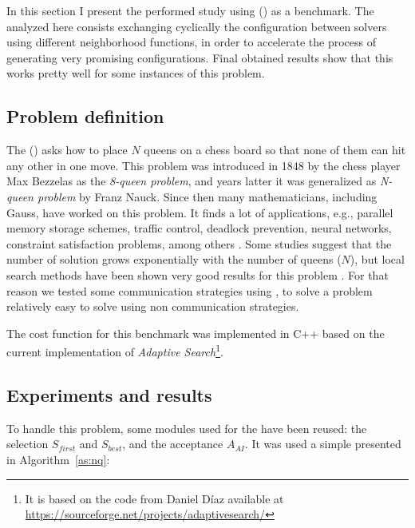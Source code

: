In this section I present the performed study using \nqp{} (\NQP) as a benchmark. The \commstr{} analyzed here consists exchanging cyclically the configuration between solvers using different neighborhood functions, in order to accelerate the process of generating very promising configurations. Final obtained results show that this \commstr{} works pretty well for some instances of this problem.

\subsection{Problem definition}

The \nqp{} (\NQP) asks how to place $N$ queens on a chess board so that none of them can hit any other in one move. This problem was introduced in 1848 by the chess player Max Bezzelas as the \textit{8-queen problem}, and years latter it was generalized as \textit{N-queen problem} by Franz Nauck. Since then many mathematicians, including Gauss, have worked on this problem. It finds a lot of applications, e.g., parallel memory storage schemes, traffic control, deadlock prevention, neural networks, constraint satisfaction problems, among others \cite{Bell2009}. Some studies suggest that the number of solution grows exponentially with the number of queens ($N$), but local search methods have been shown very good results for this problem \cite{Sosic1994}. For that reason we tested some communication strategies using \posl{}, to solve a problem relatively easy to solve using non communication strategies.

The cost function for this benchmark was implemented in C++ based on the current implementation of {\it Adaptive Search}\footnote{It is based on the code from Daniel D\'{i}az available at \href{https://sourceforge.net/projects/adaptivesearch/}{https://sourceforge.net/projects/adaptivesearch/}}.

\subsection{Experiments and results}

To handle this problem, some modules used for the \sgp{} have been reused: the selection \oms{} $S_{first}$ and $S_{best}$, and the acceptance \om{} $A_{AI}$. It was used a simple \as{} presented in Algorithm~\ref{as:nq}:

